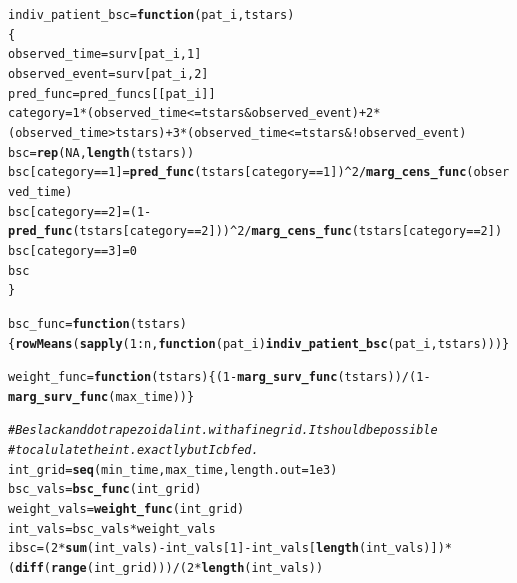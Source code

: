 \documentclass{article}\usepackage[]{graphicx}\usepackage[]{color}
\makeatletter
\newcommand{\hlnum}[1]{\textcolor[rgb]{0.686,0.059,0.569}{#1}}%
\newcommand{\hlcom}[1]{\textcolor[rgb]{0.678,0.584,0.686}{\textit{#1}}}%
\newcommand{\hlopt}[1]{\textcolor[rgb]{0,0,0}{#1}}%
\newcommand{\hlstd}[1]{\textcolor[rgb]{0.345,0.345,0.345}{#1}}%
\newcommand{\hlkwa}[1]{\textcolor[rgb]{0.161,0.373,0.58}{\textbf{#1}}}%
\newcommand{\hlkwb}[1]{\textcolor[rgb]{0.69,0.353,0.396}{#1}}%
\newcommand{\hlkwc}[1]{\textcolor[rgb]{0.333,0.667,0.333}{#1}}%
\newcommand{\hlkwd}[1]{\textcolor[rgb]{0.737,0.353,0.396}{\textbf{#1}}}%
\newenvironment{kframe}{%
 \def\at@end@of@kframe{}%
 \ifinner\ifhmode%
  \def\at@end@of@kframe{\end{minipage}}%
  \begin{minipage}{\columnwidth}%
 \fi\fi%
 \def\FrameCommand##1{\hskip\@totalleftmargin \hskip-\fboxsep
 \colorbox{shadecolor}{##1}\hskip-\fboxsep
     \hskip-\linewidth \hskip-\@totalleftmargin \hskip\columnwidth}%
 \MakeFramed {\advance\hsize-\width
   \@totalleftmargin\z@ \linewidth\hsize
   \@setminipage}}%
 {\par\unskip\endMakeFramed%
 \at@end@of@kframe}
\newenvironment{knitrout}{}{} %
\makeatother
\begin{document}
\begin{knitrout}
\begin{kframe}
\begin{alltt}
        \hlstd{indiv_patient_bsc} \hlkwb{=} \hlkwa{function}\hlstd{(}\hlkwc{pat_i}\hlstd{,} \hlkwc{tstars}\hlstd{)}
        \hlstd{\{}
                \hlstd{observed_time} \hlkwb{=} \hlstd{surv[pat_i,} \hlnum{1}\hlstd{]}
                \hlstd{observed_event} \hlkwb{=} \hlstd{surv[pat_i,} \hlnum{2}\hlstd{]}
                \hlstd{pred_func} \hlkwb{=} \hlstd{pred_funcs[[pat_i]]}
                \hlstd{category} \hlkwb{=} \hlnum{1}\hlopt{*}\hlstd{(observed_time} \hlopt{<=} \hlstd{tstars} \hlopt{&} \hlstd{observed_event)} \hlopt{+} \hlnum{2}\hlopt{*}\hlstd{(observed_time} \hlopt{>} \hlstd{tstars)} \hlopt{+} \hlnum{3}\hlopt{*}\hlstd{(observed_time} \hlopt{<=} \hlstd{tstars} \hlopt{& !}\hlstd{observed_event)}
                \hlstd{bsc} \hlkwb{=} \hlkwd{rep}\hlstd{(}\hlnum{NA}\hlstd{,} \hlkwd{length}\hlstd{(tstars))}
                \hlstd{bsc[category} \hlopt{==} \hlnum{1}\hlstd{]} \hlkwb{=} \hlkwd{pred_func}\hlstd{(tstars[category} \hlopt{==} \hlnum{1}\hlstd{])}\hlopt{^}\hlnum{2} \hlopt{/} \hlkwd{marg_cens_func}\hlstd{(observed_time)}
                \hlstd{bsc[category} \hlopt{==} \hlnum{2}\hlstd{]} \hlkwb{=} \hlstd{(}\hlnum{1} \hlopt{-} \hlkwd{pred_func}\hlstd{(tstars[category} \hlopt{==} \hlnum{2}\hlstd{]))}\hlopt{^}\hlnum{2} \hlopt{/} \hlkwd{marg_cens_func}\hlstd{(tstars[category} \hlopt{==} \hlnum{2}\hlstd{])}
                \hlstd{bsc[category} \hlopt{==} \hlnum{3}\hlstd{]} \hlkwb{=} \hlnum{0}
                \hlstd{bsc}
        \hlstd{\}}

        \hlstd{bsc_func} \hlkwb{=} \hlkwa{function}\hlstd{(}\hlkwc{tstars}\hlstd{) \{} \hlkwd{rowMeans}\hlstd{(}\hlkwd{sapply}\hlstd{(}\hlnum{1}\hlopt{:}\hlstd{n,} \hlkwa{function}\hlstd{(}\hlkwc{pat_i}\hlstd{)} \hlkwd{indiv_patient_bsc}\hlstd{(pat_i, tstars))) \}}

        \hlstd{weight_func} \hlkwb{=} \hlkwa{function}\hlstd{(}\hlkwc{tstars}\hlstd{) \{ (}\hlnum{1} \hlopt{-} \hlkwd{marg_surv_func}\hlstd{(tstars))} \hlopt{/} \hlstd{(}\hlnum{1} \hlopt{-} \hlkwd{marg_surv_func}\hlstd{(max_time)) \}}

        \hlcom{# Be slack and do trapezoidal int. with a fine grid.  It should be possible }
        \hlcom{# to calulate the int. exactly but I cbfed.}
        \hlstd{int_grid} \hlkwb{=} \hlkwd{seq}\hlstd{(min_time, max_time,} \hlkwc{length.out} \hlstd{=} \hlnum{1e3}\hlstd{)}
        \hlstd{bsc_vals} \hlkwb{=} \hlkwd{bsc_func}\hlstd{(int_grid)}
        \hlstd{weight_vals} \hlkwb{=} \hlkwd{weight_func}\hlstd{(int_grid)}
        \hlstd{int_vals} \hlkwb{=} \hlstd{bsc_vals} \hlopt{*} \hlstd{weight_vals}
        \hlstd{ibsc} \hlkwb{=} \hlstd{(}\hlnum{2}\hlopt{*}\hlkwd{sum}\hlstd{(int_vals)} \hlopt{-} \hlstd{int_vals[}\hlnum{1}\hlstd{]} \hlopt{-} \hlstd{int_vals[}\hlkwd{length}\hlstd{(int_vals)])} \hlopt{*} \hlstd{(}\hlkwd{diff}\hlstd{(}\hlkwd{range}\hlstd{(int_grid)))} \hlopt{/} \hlstd{(}\hlnum{2}\hlopt{*}\hlkwd{length}\hlstd{(int_vals))}


\end{alltt}
\end{kframe}
\end{knitrout}
\end{document}
